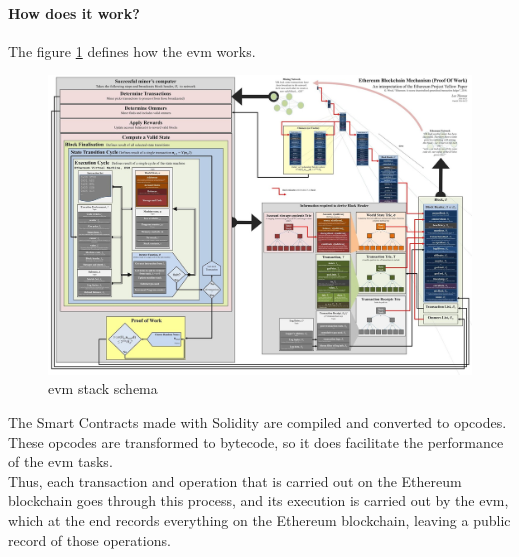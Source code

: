 \documentclass[a4paper, 12pt]{article} %
\begin{document}
            \paragraph{How does it work?}
                The figure \ref{fig:blockchain_stack} defines how the \acrshort{evm} works\cite{queEsEvm}.
                \begin{figure}[h]
                    \centering
                    \includegraphics[width=1\textwidth]{evm-stack.jpeg}
                    \caption{\acrshort{evm} stack schema}
                    \label{fig:blockchain_stack}
                \end{figure}

                The Smart Contracts made with Solidity are compiled and converted to opcodes. These opcodes are transformed to bytecode, so it does facilitate the performance of the \acrshort{evm} tasks.\\

                Thus, each transaction and operation that is carried out on the Ethereum blockchain goes through this process, and its execution is carried out by the \acrshort{evm}, which at the end records everything on the Ethereum blockchain, leaving a public record of those operations. 
\end{document}
